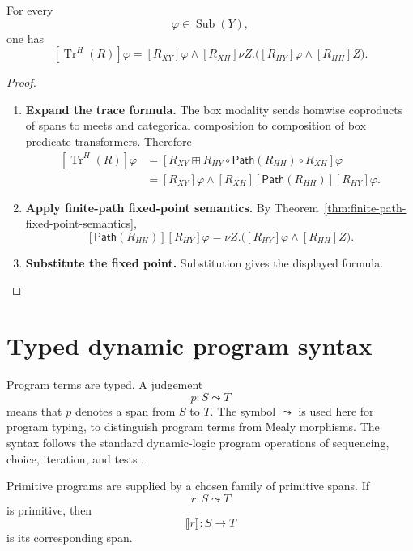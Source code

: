 \begin{theorem}
\label{thm:box-law-feedback-trace}
For every
\[
  \varphi\in\operatorname{Sub}(Y),
\]
one has
\[
  \left[
    \operatorname{Tr}^{H}(R)
  \right]\varphi
  =
  [R_{XY}]\varphi
  \wedge
  [R_{XH}]
  \nu Z.
  \bigl(
    [R_{HY}]\varphi
    \wedge
    [R_{HH}]Z
  \bigr).
\]
\end{theorem}

\begin{proof}
\begin{enumerate}
  \item \textbf{Expand the trace formula.}
  The box modality sends homwise coproducts of spans to meets and categorical
  composition to composition of box predicate transformers. Therefore
  \[
  \begin{aligned}
    \left[
      \operatorname{Tr}^{H}(R)
    \right]\varphi
    &=
    \left[
      R_{XY}
      \boxplus
      R_{HY}\circ\mathsf{Path}(R_{HH})\circ R_{XH}
    \right]\varphi
    \\
    &=
    [R_{XY}]\varphi
    \wedge
    [R_{XH}]
    [\mathsf{Path}(R_{HH})]
    [R_{HY}]\varphi.
  \end{aligned}
  \]

  \item \textbf{Apply finite-path fixed-point semantics.}
  By Theorem~\ref{thm:finite-path-fixed-point-semantics},
  \[
    [\mathsf{Path}(R_{HH})]
    [R_{HY}]\varphi
    =
    \nu Z.
    \bigl(
      [R_{HY}]\varphi
      \wedge
      [R_{HH}]Z
    \bigr).
  \]

  \item \textbf{Substitute the fixed point.}
  Substitution gives the displayed formula.
\end{enumerate}
\end{proof}

\section{Typed dynamic program syntax}
\label{sec:dynamic-program-syntax-feedback}

Program terms are typed. A judgement
\[
  p:S\leadsto T
\]
means that \(p\) denotes a span from \(S\) to \(T\). The symbol
\(\leadsto\) is used here for program typing, to distinguish program terms
from Mealy morphisms. The syntax follows the standard dynamic-logic program
operations of sequencing, choice, iteration, and tests
\cite{HarelKozenTiurynDynamicLogic}.

Primitive programs are supplied by a chosen family of primitive spans. If
\[
  r:S\leadsto T
\]
is primitive, then
\[
  \llbracket r\rrbracket:S\to T
\]
is its corresponding span.


